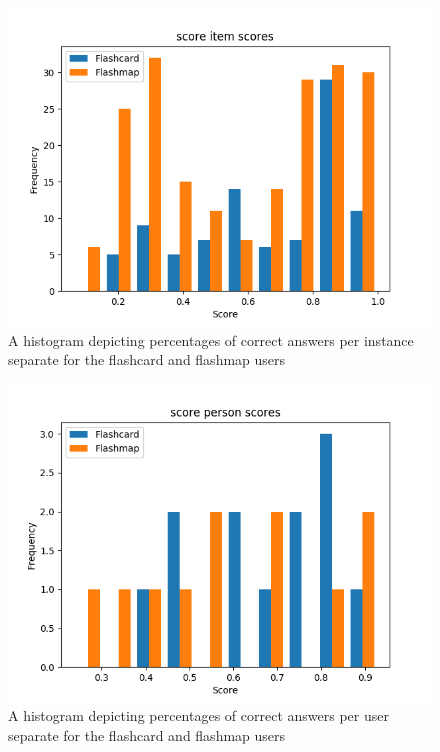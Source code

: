 \begin{figure}
    \centering
    \includegraphics[width=.7\textwidth]{img/score_diff.png}
    \caption{A histogram depicting percentages of correct answers per instance separate for the flashcard and flashmap users}
    \label{fig:score_diff}
\end{figure}
\begin{figure}
    \centering
    \includegraphics[width=.7\textwidth]{img/score_abil.png}
    \caption{A histogram depicting percentages of correct answers per user separate for the flashcard and flashmap users}
    \label{fig:score_abil}
\end{figure}

